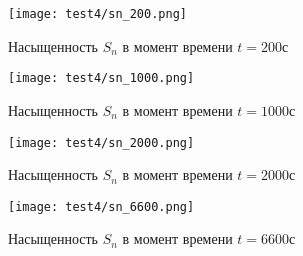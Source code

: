 \begin{figure}
  \begin{center}
    \begin{minipage}[h]{0.49\textwidth}
       \texttt{[image: test4/sn\_200.png]}
       \vspace{1cm}
       \caption{Насыщенность $S_n$ в момент времени $t=200$с}
    \end{minipage}
    \hfill
    \begin{minipage}[h]{0.49\textwidth}
       \texttt{[image: test4/sn\_1000.png]}
       \vspace{1cm}
       \caption{Насыщенность $S_n$ в момент времени $t=1000$с}
    \end{minipage}
    \vspace{3cm}
    \vfill
    \begin{minipage}[h]{0.49\textwidth}
       \texttt{[image: test4/sn\_2000.png]}
       \vspace{1cm}
       \caption{Насыщенность $S_n$ в момент времени $t=2000$с}
    \end{minipage}
    \hfill
    \begin{minipage}[h]{0.49\textwidth}
       \texttt{[image: test4/sn\_6600.png]}
       \vspace{1cm}
       \caption{Насыщенность $S_n$ в момент времени $t=6600$с}
       \label{t4_pic_end}
    \end{minipage}
    \hfill  
  \end{center}
\end{figure}
